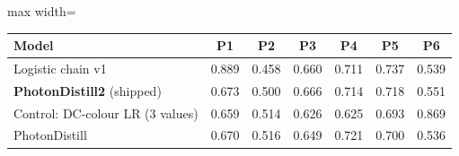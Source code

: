 {\footnotesize
\setlength{\tabcolsep}{4pt}
\begin{adjustbox}{max width=\linewidth}
\begin{tabular}{p{4cm}cccccc}
\toprule
Model & P1 & P2 & P3 & P4 & P5 & P6 \\
\midrule
Logistic chain v1 & 0.889 & 0.458 & 0.660 & 0.711 & 0.737 & 0.539 \\
\textbf{PhotonDistill2} (shipped) & 0.673 & 0.500 & 0.666 & 0.714 & 0.718 & 0.551 \\
Control: DC-colour LR (3 values) & 0.659 & 0.514 & 0.626 & 0.625 & 0.693 & 0.869 \\
PhotonDistill & 0.670 & 0.516 & 0.649 & 0.721 & 0.700 & 0.536 \\
\bottomrule
\end{tabular}
\end{adjustbox}
}
